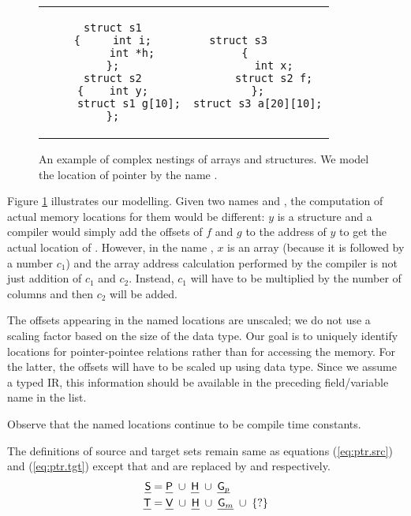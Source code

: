 \documentclass[a4paper,11pt,fleqn]{article}
\newcommand{\var}{\text{\sf\em V\/}\xspace}
\newcommand{\pointer}{\text{\sf\em P\/}\xspace}
\begin{document}
\begin{figure}
\begin{center}
\begin{tabular}{c|c}
\begin{minipage}{50mm}
\begin{verbatim}
struct s1
{     int i;
      int *h;
};
struct s2
{    int y;
     struct s1 g[10];
};
\end{verbatim}
\end{minipage}
&
\begin{minipage}{50mm}
\begin{verbatim}
struct s3      
{    
     int x;
     struct s2 f;
};
struct s3 a[20][10];
\end{verbatim}
\end{minipage}
\end{tabular}
\end{center}
\caption{An example of complex nestings of arrays and structures. We model the location of pointer
 by the name
. 
}
\label{fig:exmp.array.struct}
\end{figure}


Figure \ref{fig:exmp.array.struct} illustrates our modelling. Given two
names  and , the computation of actual
memory locations for them would be different: $y$ is a structure and a
compiler would simply add the offsets of $f$ and $g$ to the address of
$y$ to get the actual location of . However, in the name
, $x$ is an array (because it is followed by a number
$c_1$) and the array address calculation performed by the compiler is
not just addition of $c_1$ and $c_2$. Instead, $c_1$ will have to be
multiplied by the number of columns and then $c_2$ will be added.

The offsets appearing in the named locations  are unscaled; we do not use a scaling factor based on 
the size of the data type. Our goal is to uniquely identify locations for pointer-pointee relations
rather than for accessing the memory. For the latter, the offsets will have to be scaled up using data
type. Since we assume a typed IR, this information should be available in the preceding field/variable name
in the list.

Observe that the named locations continue to be compile time constants.

The definitions of source and target sets remain same as equations
(\ref{eq:ptr.src}) and (\ref{eq:ptr.tgt}) except that \structp and \structm
are replaced by \genp and \genm respectively.
\begin{align}
\source & = \pointer 
		\; \cup \; \heap 
		\; \cup \; \genp
			\\
\target & = \var 	
		\; \cup \; \heap 
		\; \cup \; \genm
		\;  \cup \; \{?\}
\end{align}
\end{document}
